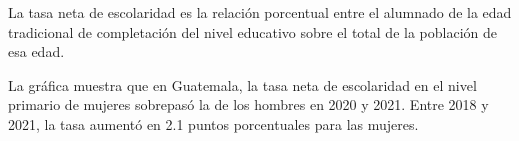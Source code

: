 La tasa neta de escolaridad es la relación porcentual entre el alumnado de la edad tradicional de completación del nivel educativo sobre el total de la población de esa edad.

La gráfica muestra que en Guatemala, la tasa neta de escolaridad en el nivel primario de mujeres sobrepasó la de los hombres en 2020 y 2021. Entre 2018 y 2021, la tasa aumentó en 2.1 puntos porcentuales para las mujeres.